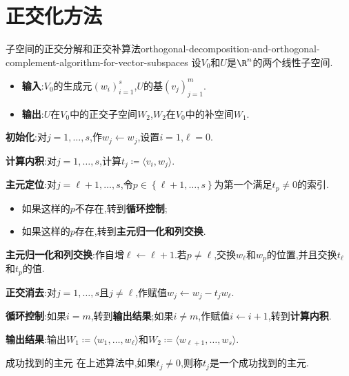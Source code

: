\section{正交化方法}

\begin{algorithm}{子空间的正交分解和正交补算法}{orthogonal-decomposition-and-orthogonal-complement-algorithm-for-vector-subspaces}
	设$V_{0}$和$U$是$\R^{n}$的两个线性子空间.
	\begin{itemize}
		\item \textbf{输入}:$V_{0}$的生成元$\left(w_{i}\right)_{i=1}^{s}$,$U$的基$\left(v_{j}\right)_{j=1}^{m}$.
		\item \textbf{输出}:$U$在$V_{0}$中的正交子空间$W_{2}$,$W_{2}$在$V_{0}$中的补空间$W_{1}$.
	\end{itemize}
	\textbf{初始化}:对$j=1,\ldots,s$,作$w_{j}\leftarrow w_{j}$,设置$i=1$,$\ell=0$.
	
	\textbf{计算内积}:对$j=1,\ldots,s$,计算$t_{j}\coloneq\langle v_{i},w_{j}\rangle$.
	
	\textbf{主元定位}:对$j=\ell+1,\ldots,s$,令$p\in\left\{\ell+1,\ldots,s\right\}$为第一个满足$t_{p}\neq 0$的索引.
	
	\begin{itemize}
		\item 如果这样的$p$不存在,转到\textbf{循环控制};
		\item 如果这样的$p$存在,转到\textbf{主元归一化和列交换}.
	\end{itemize}
	
	\textbf{主元归一化和列交换}:作自增$\ell\leftarrow\ell+1$.若$p\neq\ell$,交换$w_{\ell}$和$w_{p}$的位置,并且交换$t_{\ell}$和$t_{p}$的值.
	
	\textbf{正交消去}:对$j=1,\ldots,s$且$j\neq\ell$,作赋值$w_{j}\leftarrow w_{j}-t_{j}w_{\ell}$.
	
	\textbf{循环控制}:如果$i=m$,转到\textbf{输出结果};如果$i\neq m$,作赋值$i\leftarrow i+1$,转到\textbf{计算内积}.
	
	\textbf{输出结果}:输出$W_{1}\coloneq\langle w_{1},\ldots,w_{\ell}\rangle$和$W_{2}\coloneq\langle w_{\ell+1},\ldots,w_{s}\rangle$.
\end{algorithm}

\begin{remark}{成功找到的主元}{}
	在上述算法中,如果$t_{j}\neq 0$,则称$t_{j}$是一个成功找到的主元.
\end{remark}